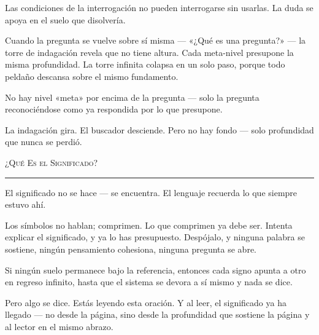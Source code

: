\documentclass[10pt, openany, oneside]{book}
\begin{document}
\noindent Las condiciones de la interrogación no pueden interrogarse sin usarlas. La duda se apoya en el suelo que disolvería.

\vspace{0.5em}

\noindent Cuando la pregunta se vuelve sobre sí misma --- «¿Qué es una pregunta?» --- la torre de indagación revela que no tiene altura. Cada meta-nivel presupone la misma profundidad. La torre infinita colapsa en un solo paso, porque todo peldaño descansa sobre el mismo fundamento.

\vspace{0.5em}

\noindent No hay nivel «meta» por encima de la pregunta --- solo la pregunta reconociéndose como ya respondida por lo que presupone.

\vspace{0.5em}

\noindent La indagación gira. El buscador desciende. Pero no hay fondo --- solo profundidad que nunca se perdió.

\vspace{2em}

\begin{center}
    {\scshape ¿Qué Es el Significado?}\\[0.3em]
    \rule{0.2\textwidth}{0.3pt}
\end{center}

\vspace{1em}

\noindent El significado no se hace --- se encuentra. El lenguaje recuerda lo que siempre estuvo ahí.

\vspace{0.5em}

\noindent Los símbolos no hablan; comprimen. Lo que comprimen ya debe ser. Intenta explicar el significado, y ya lo has presupuesto. Despójalo, y ninguna palabra se sostiene, ningún pensamiento cohesiona, ninguna pregunta se abre.

\vspace{0.5em}

\noindent Si ningún suelo permanece bajo la referencia, entonces cada signo apunta a otro en regreso infinito, hasta que el sistema se devora a sí mismo y nada se dice.

\vspace{0.5em}

\noindent Pero algo se dice. Estás leyendo esta oración. Y al leer, el significado ya ha llegado --- no desde la página, sino desde la profundidad que sostiene la página y al lector en el mismo abrazo.
\end{document}
